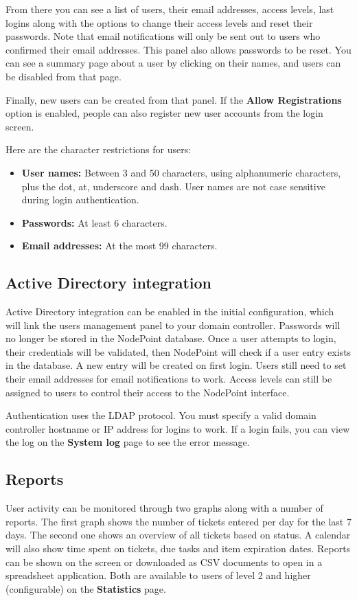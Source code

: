 \documentclass[11pt]{article}
\begin{document}
From there you can see a list of users, their email addresses, access levels, last logins along with the options to change their access levels and reset their passwords. Note that email notifications will only be sent out to users who confirmed their email addresses. This panel also allows passwords to be reset. You can see a summary page about a user by clicking on their names, and users can be disabled from that page.

Finally, new users can be created from that panel. If the \textbf{Allow Registrations} option is enabled, people can also register new user accounts from the login screen.

Here are the character restrictions for users:

\begin{itemize}
\item \textbf{User names:} Between 3 and 50 characters, using alphanumeric characters, plus the dot, at, underscore and dash. User names are not case sensitive during login authentication.
\item \textbf{Passwords:} At least 6 characters.
\item \textbf{Email addresses:} At the most 99 characters.
\end{itemize}

\subsection{Active Directory integration}
Active Directory integration can be enabled in the initial configuration, which will link the users management panel to your domain controller. Passwords will no longer be stored in the NodePoint database. Once a user attempts to login, their credentials will be validated, then NodePoint will check if a user entry exists in the database. A new entry will be created on first login. Users still need to set their email addresses for email notifications to work. Access levels can still be assigned to users to control their access to the NodePoint interface.

Authentication uses the LDAP protocol. You must specify a valid domain controller hostname or IP address for logins to work. If a login fails, you can view the log on the \textbf{System log} page to see the error message.

\subsection{Reports}
User activity can be monitored through two graphs along with a number of reports. The first graph shows the number of tickets entered per day for the last 7 days. The second one shows an overview of all tickets based on status. A calendar will also show time spent on tickets, due tasks and item expiration dates. Reports can be shown on the screen or downloaded as CSV documents to open in a spreadsheet application. Both are available to users of level 2 and higher (configurable) on the \textbf{Statistics} page.
\end{document}

